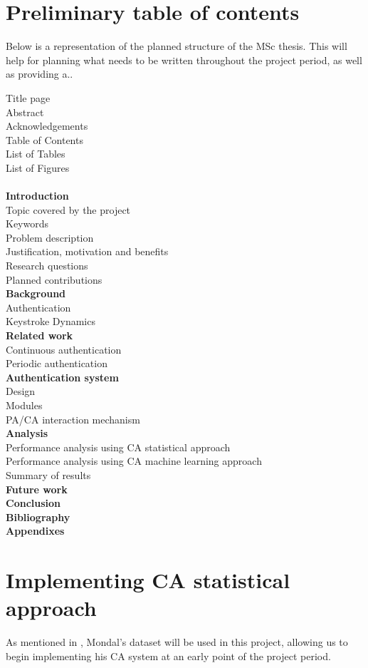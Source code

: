 \documentclass[informationsecurity]{gucmasterproject}
\begin{document}
\section{Preliminary table of contents}
Below is a representation of the planned structure of the MSc thesis.
This will help for planning what needs to be written throughout the project period, as well as providing a.. %

Title page\\
Abstract\\
Acknowledgements\\
Table of Contents\\
List of Tables\\
List of Figures\\
\\
\textbf{Introduction}\\
\indent Topic covered by the project\\
\indent Keywords\\
\indent Problem description\\
\indent Justification, motivation and benefits\\
\indent Research questions\\
\indent Planned contributions\\
\textbf{Background}\\
\indent Authentication\\
\indent Keystroke Dynamics\\
\textbf{Related work}\\
\indent Continuous authentication\\
\indent Periodic authentication\\
\textbf{Authentication system}\\
\indent Design\\
\indent Modules\\
\indent PA/CA interaction mechanism\\
\textbf{Analysis}\\
\indent Performance analysis using CA statistical approach\\
\indent Performance analysis using CA machine learning approach\\
\indent Summary of results\\
\textbf{Future work}\\
\textbf{Conclusion}\\
\textbf{Bibliography}\\
\textbf{Appendixes}

\section{Implementing CA statistical approach}
As mentioned in , Mondal's \cite{mondal} dataset will be used in this project, allowing us to begin implementing his CA system at an early point of the project period. 
\end{document}
